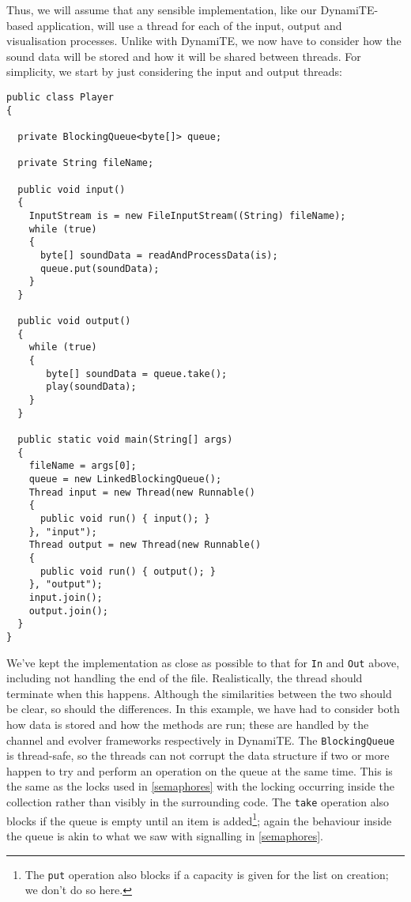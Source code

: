 Thus, we will assume that any sensible implementation, like our
DynamiTE-based application, will use a thread for each of the input,
output and visualisation processes.  Unlike with DynamiTE, we now have
to consider how the sound data will be stored and how it will be
shared between threads.  For simplicity, we start by just considering
the input and output threads:

\begin{verbatim}
public class Player
{

  private BlockingQueue<byte[]> queue;

  private String fileName;

  public void input()
  {
    InputStream is = new FileInputStream((String) fileName);
    while (true)
    {
      byte[] soundData = readAndProcessData(is);
      queue.put(soundData);
    }
  }

  public void output()
  {
    while (true)
    {
       byte[] soundData = queue.take();
       play(soundData);
    }
  }

  public static void main(String[] args)
  {
    fileName = args[0];
    queue = new LinkedBlockingQueue();
    Thread input = new Thread(new Runnable()
    {
      public void run() { input(); }
    }, "input");
    Thread output = new Thread(new Runnable()
    {
      public void run() { output(); }
    }, "output");
    input.join();
    output.join();
  }
}     
\end{verbatim}

We've kept the implementation as close as possible to that for
\texttt{In} and \texttt{Out} above, including not handling the end of
the file.  Realistically, the thread should terminate when this
happens.  Although the similarities between the two should be clear,
so should the differences.  In this example, we have had to consider
both how data is stored and how the methods are run; these are handled
by the channel and evolver frameworks respectively in DynamiTE.  The
\texttt{BlockingQueue} is thread-safe, so the threads can not corrupt
the data structure if two or more happen to try and perform an
operation on the queue at the same time.  This is the same as the
locks used in \ref{semaphores} with the locking occurring inside the
collection rather than visibly in the surrounding code.  The
\texttt{take} operation also blocks if the queue is empty until an
item is added\footnote{The \texttt{put} operation also blocks if a
  capacity is given for the list on creation; we don't do so here.};
again the behaviour inside the queue is akin to what we saw with
signalling in \ref{semaphores}.

